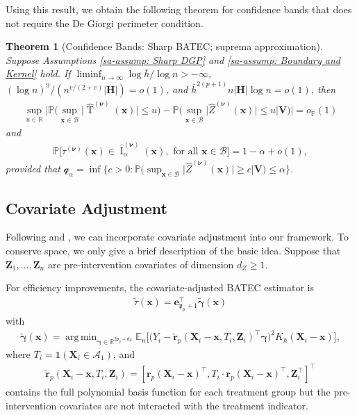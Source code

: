 \documentclass[10pt]{article}
\newtheorem{thm}{Theorem}
\DeclareMathOperator*{\argmin}{arg\,min}
\DeclareMathOperator{\Tstat}{T}
\DeclareMathOperator{\CI}{I}
\renewcommand{\P}{\mathbb{P}}
\newcommand{\Indicator}{\mathds{1}}
\newcommand{\En}{\mathbb{E}_n}
\newcommand{\reals}{\mathbb{R}}
\newcommand{\be}{\mathbf{e}}
\newcommand{\bH}{\mathbf{H}}
\newcommand{\br}{\mathbf{r}}
\newcommand{\bV}{\mathbf{V}}
\newcommand{\bx}{\mathbf{x}}
\newcommand{\bX}{\mathbf{X}}
\newcommand{\bZ}{\mathbf{Z}}
\newcommand{\bnu}{\boldsymbol{\nu}}
\newcommand{\bgamma}{\boldsymbol{\gamma}}
\newcommand{\A}{\mathcal{A}}
\newcommand{\B}{\mathcal{B}}
\newcommand{\q}{\mathcal{q}}
\begin{document}
Using this result, we obtain the following theorem for confidence bands that does not require the De Giorgi perimeter condition.

\begin{thm}[Confidence Bands: Sharp BATEC; suprema approximation]\label{sa-thm: Confidence Bands: Sharp BATEC -- Suprema}
    Suppose Assumptions \ref{sa-assump: Sharp DGP} and \ref{sa-assump: Boundary and Kernel} hold. If $\liminf_{n \to \infty} \log \bar{h}/\log n > -\infty$, $(\log n)^9/(n^{v/(2+v)}|\bH|)=o(1)$, and $\bar{h}^{2(p+1)}n|\bH|\log n=o(1)$, then
    \begin{align*}
        \sup_{u \in \reals} \Big|\P \Big(\sup_{\bx \in \B} \big|\widehat{\Tstat}^{(\bnu)}(\bx)\big| \leq u \Big)
                            - \P \Big(\sup_{\bx \in \B} \big|\widehat{Z}^{(\bnu)}(\bx)\big| \leq u \Big| \bV \Big) \Big| = o_{\P}(1)
    \end{align*}
    and
    \begin{align*}
        \P\Big[\tau^{(\bnu)}(\bx) \in \widehat{\CI}_{\alpha}^{(\bnu)}(\bx), \text{ for all } \bx \in \B \Big] = 1 - \alpha + o(1),
    \end{align*}
    provided that $\q_{\alpha} = \inf \big\{c > 0: \P \big(\sup_{\bx \in \B} \big|\widehat{Z}^{(\bnu)}(\bx)\big|\geq c \big| \bV \big) \leq \alpha \big\}$.
\end{thm}

\subsection{Covariate Adjustment}

Following \cite{Calonico-Cattaneo-Farrell-Titiunik_2019_RESTAT} and \cite{Calonico-Cattaneo-Farrell-Palomba-Titiunik_2026_wp}, we can incorporate covariate adjustment into our framework. To conserve space, we only give a brief description of the basic idea. Suppose that $\bZ_1,\ldots,\bZ_n$ are pre-intervention covariates of dimension $d_Z\geq1$.

For efficiency improvements, the covariate-adjusted BATEC estimator is
\begin{align*}
    \widetilde{\tau}(\bx) = \be_{\mathfrak{p}_p+1}^{\top}\widetilde{\bgamma}(\bx)
\end{align*}
with
\begin{align*}
    \widetilde{\bgamma}(\bx)
    = \argmin_{\bgamma \in \mathbb{R}^{2\mathfrak{p}_p+d_Z}}
      \En \big[ \big(Y_i - \widetilde{\br}_p(\bX_i-\bx,T_i,\bZ_i)^\top \bgamma \big)^2
                K_h(\bX_i - \bx) \big],
\end{align*}
where $T_i=\Indicator(\bX_i \in \A_1)$, and
\begin{align*}
    \widetilde{\br}_p(\bX_i-\bx,T_i,\bZ_i) = [\br_p(\bX_i - \bx)^{\top},T_i\cdot\br_p(\bX_i - \bx)^{\top},\bZ_i^\top]^\top
\end{align*}
contains the full polynomial basis function for each treatment group but the pre-intervention covariates are not interacted with the treatment indicator.
\end{document}
